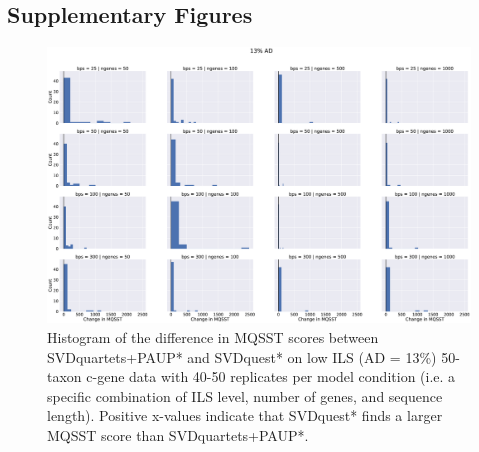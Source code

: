 
\subsection{Supplementary Figures}


\clearpage
\begin{figure}
\includegraphics[width=\textwidth]{svdquest-figs/all-scorediffs-hist-cgenes-13.eps}
\caption[Histogram of differences in MQSST scores between SVDquartets+PAUP* and SVDquest* for the low ILS 50-taxon datasets]{Histogram of the difference in MQSST scores between
  SVDquartets+PAUP* and SVDquest*  on low ILS (AD = 13\%) 50-taxon c-gene data
  with 40-50 replicates per model condition (i.e. a specific combination of ILS level, number of genes, and sequence length). Positive x-values
  indicate that SVDquest* finds a larger MQSST score than
  SVDquartets+PAUP*.}
  \label{fig:s1}
\end{figure}




\clearpage

